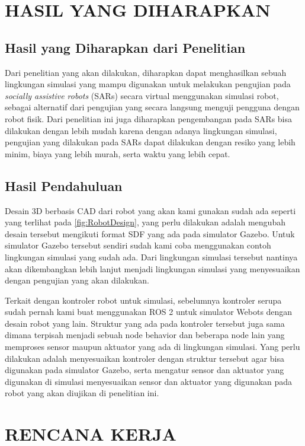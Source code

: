 \section{HASIL YANG DIHARAPKAN}

\subsection{Hasil yang Diharapkan dari Penelitian}

Dari penelitian yang akan dilakukan, diharapkan dapat menghasilkan sebuah lingkungan simulasi yang mampu digunakan untuk melakukan pengujian pada \emph{socially assistive robots} (SARs) secara virtual menggunakan simulasi robot, sebagai alternatif dari pengujian yang secara langsung menguji pengguna dengan robot fisik.
Dari penelitian ini juga diharapkan pengembangan pada SARs bisa dilakukan dengan lebih mudah karena dengan adanya lingkungan simulasi, pengujian yang dilakukan pada SARs dapat dilakukan dengan resiko yang lebih minim, biaya yang lebih murah, serta waktu yang lebih cepat.

\subsection{Hasil Pendahuluan}

Desain 3D berbasis CAD dari robot yang akan kami gunakan sudah ada seperti yang terlihat pada \ref{fig:RobotDesign}, yang perlu dilakukan adalah mengubah desain tersebut mengikuti format SDF yang ada pada simulator Gazebo.
Untuk simulator Gazebo tersebut sendiri sudah kami coba menggunakan contoh lingkungan simulasi yang sudah ada.
Dari lingkungan simulasi tersebut nantinya akan dikembangkan lebih lanjut menjadi lingkungan simulasi yang menyesuaikan dengan pengujian yang akan dilakukan.

Terkait dengan kontroler robot untuk simulasi, sebelumnya kontroler serupa sudah pernah kami buat menggunakan ROS 2 untuk simulator Webots dengan desain robot yang lain.
Struktur yang ada pada kontroler tersebut juga sama dimana terpisah menjadi sebuah node behavior dan beberapa node lain yang memproses sensor maupun aktuator yang ada di lingkungan simulasi.
Yang perlu dilakukan adalah menyesuaikan kontroler dengan struktur tersebut agar bisa digunakan pada simulator Gazebo, serta mengatur sensor dan aktuator yang digunakan di simulasi menyesuaikan sensor dan aktuator yang digunakan pada robot yang akan diujikan di penelitian ini.

\section{RENCANA KERJA}

